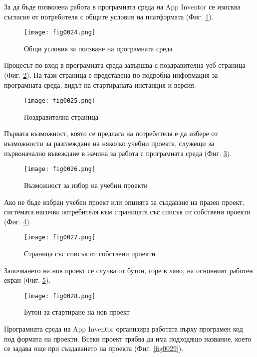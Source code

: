За да бъде позволена работа в програмната среда на App Inventor се изисква съгласие от потребителя с общите условия на платформата (Фиг. \ref{fig0024}).

\begin{figure}[H]
  \centering
  \texttt{[image: fig0024.png]}
  \caption{Общи условия за ползване на програмната среда}
\label{fig0024}
\end{figure}

Процесът по вход в програмната среда завършва с поздравителна уеб страница (Фиг. \ref{fig0025}). На тази страница е представена по-подробна информация за програмната среда, видът на стартираната инстанция и версия. 

\begin{figure}[H]
  \centering
  \texttt{[image: fig0025.png]}
  \caption{Поздравителна страница}
\label{fig0025}
\end{figure}

Първата възможност, която се предлага на потребителя е да избере от възможности за разглеждане на няколко учебни проекта, служещи за първоначално въвеждане в начина за работа с програмната среда (Фиг. \ref{fig0026}).

\begin{figure}[H]
  \centering
  \texttt{[image: fig0026.png]}
  \caption{Възможност за избор на учебни проекти}
\label{fig0026}
\end{figure}

Ако не бъде избран учебен проект или опцията за създаване на празен проект, системата насочва потребителя към страницата със списък от собствени проекти (Фиг. \ref{fig0027}).

\begin{figure}[H]
  \centering
  \texttt{[image: fig0027.png]}
  \caption{Страница със списък от собствени проекти}
\label{fig0027}
\end{figure}

Започването на нов проект се случва от бутон, горе в ляво, на основният работен екран (Фиг. \ref{fig0028}).

\begin{figure}[H]
  \centering
  \texttt{[image: fig0028.png]}
  \caption{Бутон за стартиране на нов проект}
\label{fig0028}
\end{figure}

Програмната среда на App Inventor организира работата върху програмен код под формата на проекти. Всеки проект трябва да има подходящо название, което се задава още при създаването на проекта (Фиг. \ref{fig0029}).

